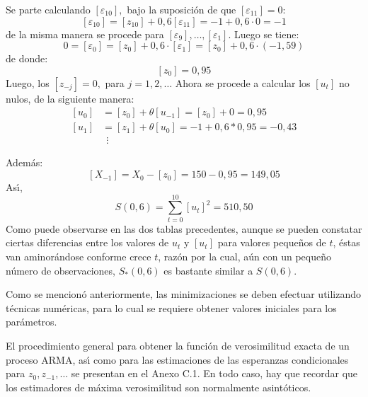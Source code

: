 \begin{ejemplo}
Se parte calculando $\left[ {\varepsilon_{10} } \right],$ bajo la 
suposici\'{o}n de que $\left[ {\varepsilon_{11} } \right]=0$:
\[
\left[ {\varepsilon_{10} } \right]=\left[ {z_{10} } \right]+0,6\left[ 
{\varepsilon_{11} } \right]=-1+0,6\cdot 0=-1
\]
de la misma manera se procede para $\left[ {\varepsilon_{9} } 
\right],\ldots,\left[ {\varepsilon_{1} } \right].$ Luego se tiene:
\[
0=\left[ {\varepsilon_{0} } \right]=\left[ {z_{0} } \right]+0,6\cdot \left[ 
{\varepsilon_{1} } \right]=\left[ {z_{0} } \right]+0,6\cdot \left( {-1,59} 
\right)
\]
de donde:
\[
\left[ {z_{0} } \right]=0,95
\]
Luego, los $\left[ {z_{-j} } \right]=0,$ para $j=1,2,\ldots$ Ahora 
se procede a calcular los $\left[ {u_{t} } \right]$ no nulos, de la 
siguiente manera:
\begin{align*}
\left[ {u_{0} } \right]&=\left[ {z_{0} } \right]+\theta \left[ {u_{-1} } 
\right]=\left[ {z_{0} } \right]+0=0,95 \\ 
 \left[ {u_{1} } \right]&=\left[ {z_{1} } \right]+\theta \left[ {u_{0} } 
\right]=-1+0,6\ast 0,95=-0,43 \\ 
 &\ \ \vdots 
\end{align*}

Adem\'{a}s:
\[
\left[ {X_{-1} } \right]=X_{0} -\left[ {z_{0} } \right]=150-0,95=149,05
\]
As\'{\i},
\[
S\left( {0,6} \right)=\sum_{t=0}^{10} {\left[ {u_{t} } 
\right]^{2}=510,50} 
\]
Como puede observarse en las dos tablas precedentes, aunque se pueden 
constatar ciertas diferencias entre los valores de $u_{t}$ y $\left[ {u_{t} } \right]$ para valores peque\~{n}os de $t$, \'{e}stas van 
aminor\'{a}ndose conforme crece $t$, raz\'{o}n por la cual, a\'{u}n con un 
peque\~{n}o n\'{u}mero de observaciones, $S_{\ast } (0,6)$ es bastante 
similar a $S\left( {0,6} \right).$

Como se mencion\'{o} anteriormente, las minimizaciones se deben efectuar 
utilizando t\'{e}cnicas num\'{e}ricas, para lo cual se requiere obtener 
valores iniciales para los par\'{a}metros.

El procedimiento general para obtener la funci\'{o}n de verosimilitud exacta 
de un proceso ARMA, as\'{\i} como para las estimaciones de las esperanzas 
condicionales para $z_{0} ,z_{-1} ,\ldots $ se presentan en el 
Anexo C.1. En todo caso, hay que recordar que los estimadores de m\'{a}xima 
verosimilitud son normalmente asint\'{o}ticos.
\end{ejemplo}


